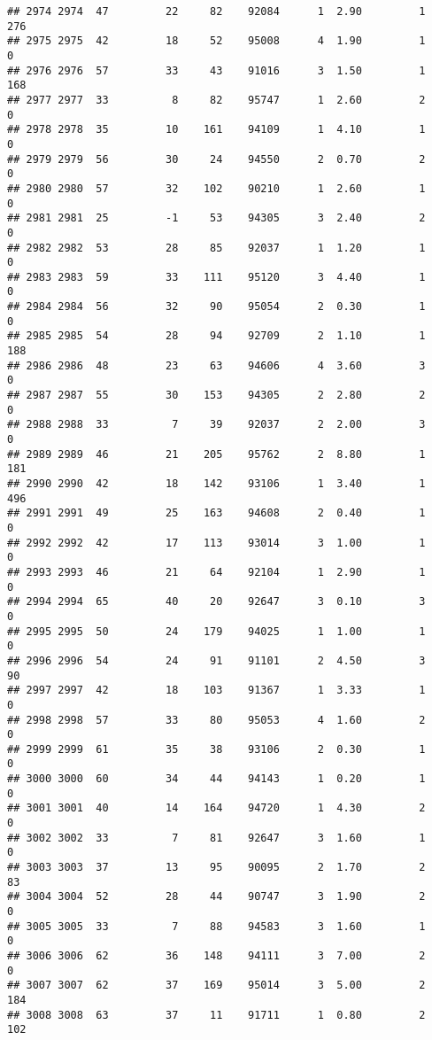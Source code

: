 \documentclass[
]{article}
\begin{document}
\begin{verbatim}
## 2974 2974  47         22     82    92084      1  2.90         1      276
## 2975 2975  42         18     52    95008      4  1.90         1        0
## 2976 2976  57         33     43    91016      3  1.50         1      168
## 2977 2977  33          8     82    95747      1  2.60         2        0
## 2978 2978  35         10    161    94109      1  4.10         1        0
## 2979 2979  56         30     24    94550      2  0.70         2        0
## 2980 2980  57         32    102    90210      1  2.60         1        0
## 2981 2981  25         -1     53    94305      3  2.40         2        0
## 2982 2982  53         28     85    92037      1  1.20         1        0
## 2983 2983  59         33    111    95120      3  4.40         1        0
## 2984 2984  56         32     90    95054      2  0.30         1        0
## 2985 2985  54         28     94    92709      2  1.10         1      188
## 2986 2986  48         23     63    94606      4  3.60         3        0
## 2987 2987  55         30    153    94305      2  2.80         2        0
## 2988 2988  33          7     39    92037      2  2.00         3        0
## 2989 2989  46         21    205    95762      2  8.80         1      181
## 2990 2990  42         18    142    93106      1  3.40         1      496
## 2991 2991  49         25    163    94608      2  0.40         1        0
## 2992 2992  42         17    113    93014      3  1.00         1        0
## 2993 2993  46         21     64    92104      1  2.90         1        0
## 2994 2994  65         40     20    92647      3  0.10         3        0
## 2995 2995  50         24    179    94025      1  1.00         1        0
## 2996 2996  54         24     91    91101      2  4.50         3       90
## 2997 2997  42         18    103    91367      1  3.33         1        0
## 2998 2998  57         33     80    95053      4  1.60         2        0
## 2999 2999  61         35     38    93106      2  0.30         1        0
## 3000 3000  60         34     44    94143      1  0.20         1        0
## 3001 3001  40         14    164    94720      1  4.30         2        0
## 3002 3002  33          7     81    92647      3  1.60         1        0
## 3003 3003  37         13     95    90095      2  1.70         2       83
## 3004 3004  52         28     44    90747      3  1.90         2        0
## 3005 3005  33          7     88    94583      3  1.60         1        0
## 3006 3006  62         36    148    94111      3  7.00         2        0
## 3007 3007  62         37    169    95014      3  5.00         2      184
## 3008 3008  63         37     11    91711      1  0.80         2      102

\end{verbatim}
\end{document}
